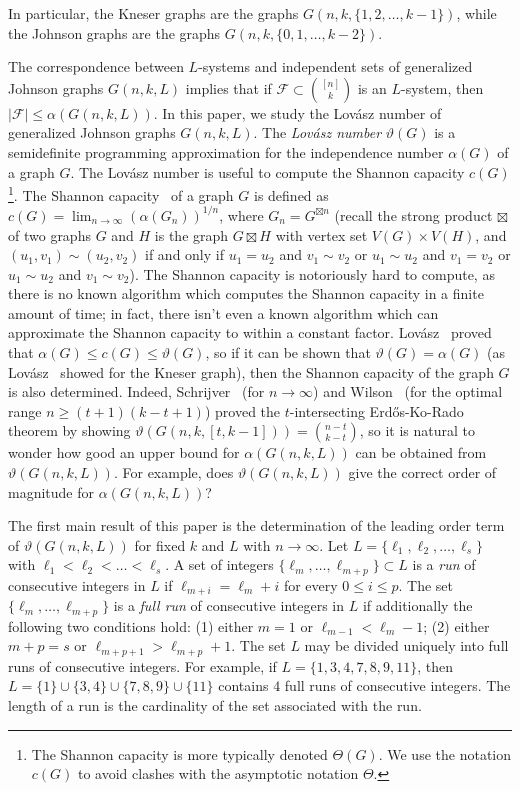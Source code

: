 \documentclass[11pt]{article}
\theoremstyle{definition}
\theoremstyle{remark}
\newcommand{\cF}{\mathcal{F}}
\begin{document}
In particular, the Kneser graphs are the graphs $G(n, k, \{1, 2, \ldots, k-1\})$, while the Johnson graphs are the graphs $G(n, k, \{0, 1, \ldots, k-2\})$. 

The correspondence between $L$-systems and independent sets of generalized Johnson graphs $G(n, k, L)$ implies that if $\cF \subset \binom{[n]}{k}$ is an $L$-system, then $|\cF| \le \alpha(G(n, k, L))$. In this paper, we study the Lov\'asz number of generalized Johnson graphs $G(n, k, L)$. The \emph{Lov\'asz number }$\vartheta(G)$ is a semidefinite programming approximation for the independence number $\alpha(G)$ of a graph $G$. The Lov\'asz number is useful to compute the Shannon capacity $c(G)$\footnote{The Shannon capacity is more typically denoted $\Theta(G)$. We use the notation $c(G)$ to avoid clashes with the asymptotic notation $\Theta$.}. The Shannon capacity~\cite{Sh1956} of a graph $G$ is defined as $c(G) = \lim_{n\rightarrow\infty}(\alpha(G_n))^{1/n}$, where $G_n = G^{\boxtimes n}$ (recall the strong product $\boxtimes$ of two graphs $G$ and $H$ is the graph $G\boxtimes H$ with vertex set $V(G) \times V(H)$, and $(u_1, v_1) \sim (u_2, v_2)$ if and only if $u_1 = u_2$ and $v_1 \sim v_2$ or $u_1 \sim u_2$ and $v_1 = v_2$ or $u_1\sim u_2$ and $v_1\sim v_2$). The Shannon capacity is notoriously hard to compute, as there is no known algorithm which computes the Shannon capacity in a finite amount of time; in fact, there isn't even a known algorithm which can approximate the Shannon capacity to within a constant factor. Lov\'asz~\cite{L} proved that $\alpha(G) \le c(G) \le \vartheta(G)$, so if it can be shown that $\vartheta(G) = \alpha(G)$ (as Lov\'asz~\cite[Theorem 13]{L} showed for the Kneser graph), then the Shannon capacity of the graph $G$ is also determined. Indeed, Schrijver~\cite{Sch1978} (for $n\rightarrow \infty$) and Wilson~\cite{Wilson1984} (for the optimal range $n\ge (t+1)(k-t+1)$) proved the $t$-intersecting Erd\H{o}s-Ko-Rado theorem by showing $\vartheta(G(n, k, [t, k-1])) = \binom{n-t}{k-t}$, so it is natural to wonder how good an upper bound for $\alpha(G(n, k, L))$ can be obtained from $\vartheta(G(n, k, L))$. For example, does $\vartheta(G(n, k, L))$ give the correct order of magnitude for $\alpha(G(n, k, L))$? 

The first main result of this paper is the determination of the leading order term of $\vartheta(G(n, k, L))$ for fixed $k$ and $L$ with $n\rightarrow\infty$. Let $L = \{\ell_1, \ell_2, \ldots, \ell_s\}$ with $\ell_1 < \ell_2 < \ldots < \ell_s$. A set of integers $\{\ell_{m}, \ldots, \ell_{m+p}\} \subset L$ is a \textit{run} of consecutive integers in $L$ if $\ell_{m + i} = \ell_m + i$ for every $0\le i\le p$. The set $\{\ell_m, \ldots, \ell_{m+p}\}$ is a \textit{full run} of consecutive integers in $L$ if additionally the following two conditions hold: (1) either $m=1$ or $\ell_{m-1} < \ell_m - 1$; (2) either $m+p = s$ or $\ell_{m+p+1} > \ell_{m+p} + 1$. The set $L$ may be divided uniquely into full runs of consecutive integers. For example, if $L = \{1, 3, 4, 7, 8, 9, 11\}$, then $L = \{1\} \cup \{3, 4\} \cup \{7, 8, 9\} \cup \{11\}$ contains $4$ full runs of consecutive integers. The length of a run is the cardinality of the set associated with the run. 
\end{document}
